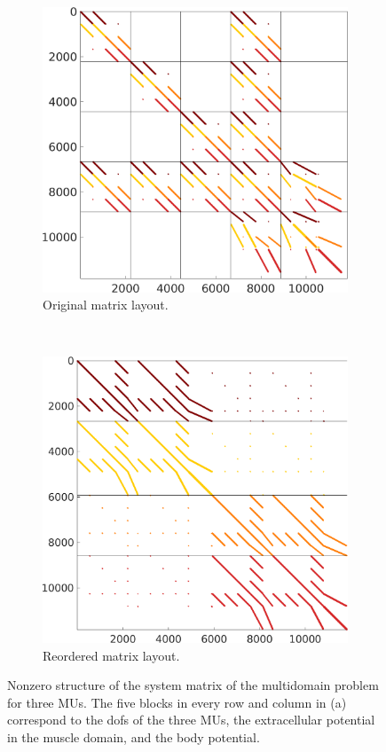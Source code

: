 \begin{figure}%
  \centering%
  \begin{subfigure}[t]{0.49\textwidth}%
    \centering%
    \includegraphics[width=\textwidth]{images/implementation/original_matrix.png}
    \caption{Original matrix layout.}%
    \label{fig:original_matrix}%
  \end{subfigure}
  \,
  \begin{subfigure}[t]{0.49\textwidth}%
    \centering%
    \includegraphics[width=\textwidth]{images/implementation/reordered_matrix.png}
    \caption{Reordered matrix layout.}%
    \label{fig:reordered_matrix}%
  \end{subfigure}
  \caption{Nonzero structure of the system matrix of the multidomain problem for three MUs. The five blocks in every row and column in (a) correspond to the dofs of the three MUs, the extracellular potential in the muscle domain, and the body potential.}%
  \label{fig:original_reordered_matrix}%
\end{figure}%

